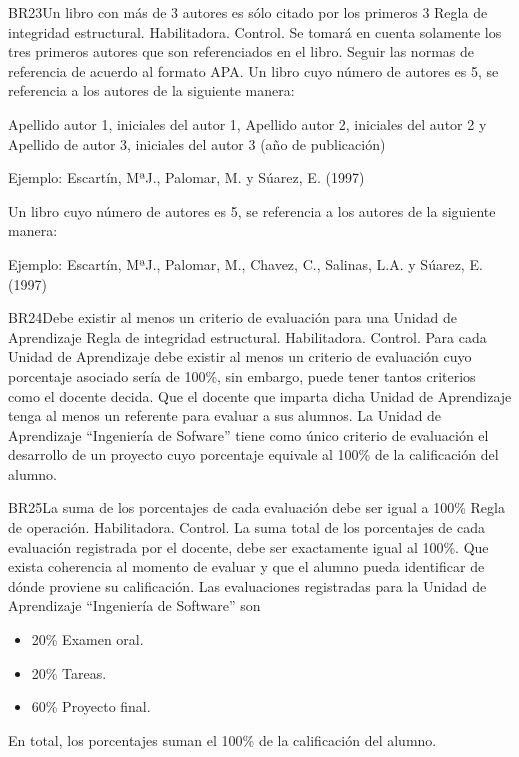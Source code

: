 \begin{BussinesRule}{BR23}{Un libro con más de 3 autores es sólo citado por los primeros 3}
    \BRitem[Tipo:] Regla de integridad estructural.
    \BRitem[Clase:] Habilitadora.
    \BRitem[Nivel:] Control.
    \BRitem[Descripción:] Se tomará en cuenta solamente los tres primeros autores que son referenciados en el libro.
    \BRitem[Motivación:] Seguir las normas de referencia de acuerdo al formato APA.
     Un libro cuyo número de autores es 5, se referencia a los autores de la siguiente manera:

    Apellido autor 1, iniciales del autor 1, Apellido autor 2, iniciales del autor 2 y Apellido de autor 3, iniciales del autor 3 (año de publicación)

Ejemplo: Escartín, MªJ., Palomar, M. y Súarez, E. (1997)

     Un libro cuyo número de autores es 5, se referencia a los autores de la siguiente manera:

    Ejemplo: Escartín, MªJ., Palomar, M., Chavez, C., Salinas, L.A. y Súarez, E. (1997)
\end{BussinesRule}

\begin{BussinesRule}{BR24}{Debe existir al menos un criterio de evaluación para una Unidad de Aprendizaje}
	\BRitem[Tipo:] Regla de integridad estructural.
	\BRitem[Clase:] Habilitadora.
	\BRitem[Nivel:] Control.
	\BRitem[Descripción:] Para cada Unidad de Aprendizaje debe existir al menos un criterio de evaluación cuyo porcentaje asociado sería de 100\%, sin embargo, puede tener tantos criterios como el docente decida.
	\BRitem[Motivación:] Que el docente que imparta dicha Unidad de Aprendizaje tenga al menos un referente para evaluar a sus alumnos.
	 La Unidad de Aprendizaje ``Ingeniería de Sofware'' tiene como único criterio de evaluación el desarrollo de un proyecto cuyo porcentaje equivale al 100\% de la calificación del alumno.
\end{BussinesRule}

\begin{BussinesRule}{BR25}{La suma de los porcentajes de cada evaluación debe ser igual a 100\%}
	\BRitem[Tipo:] Regla de operación.
	\BRitem[Clase:] Habilitadora.
	\BRitem[Nivel:] Control.
	\BRitem[Descripción:] La suma total de los porcentajes de cada evaluación registrada por el docente, debe ser exactamente igual al 100\%.
	\BRitem[Motivación:] Que exista coherencia al momento de evaluar y que el alumno pueda identificar de dónde proviene su calificación.
	 Las evaluaciones registradas para la Unidad de Aprendizaje ``Ingeniería de Software'' son
		\begin{itemize}
			\item 20\% Examen oral.
			\item 20\% Tareas.
			\item 60\% Proyecto final.
		\end{itemize}
		En total, los porcentajes suman el 100\% de la calificación del alumno.
\end{BussinesRule}

\begin{BussinesRule}{}{}
	\BRitem[Tipo:]
	\BRitem[Clase:]
	\BRitem[Nivel:]
	\BRitem[Descripción:]
	\BRitem[Motivación:]
\end{BussinesRule}